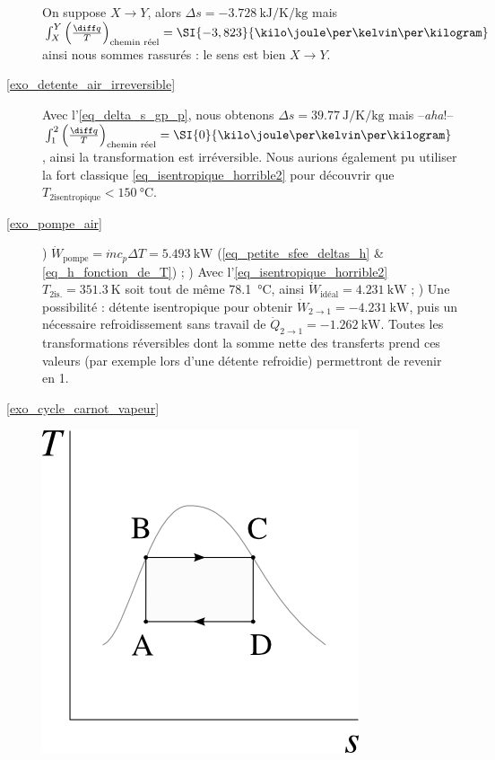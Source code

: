 \begin{description}
						\tab On suppose $X\to Y$, alors $\Delta s = \SI{-3,728}{\kilo\joule\per\kelvin\per\kilogram}$ mais $\int_X^Y \left(\frac{\diff q}{T}\right)_\text{chemin réel} = \SI{-3,823}{\kilo\joule\per\kelvin\per\kilogram}$ ainsi nous sommes rassurés : le sens est bien $X\to Y$.
		\item [\ref{exo_detente_air_irreversible}]
						\tab Avec l’\cref{eq_delta_s_gp_p}, nous obtenons $\Delta s = \SI{+39,77}{\joule\per\kelvin\per\kilogram}$ mais --\textit{aha}!-- $\int_1^2 \left(\frac{\diff q}{T}\right)_\text{chemin réel} = \SI{0}{\kilo\joule\per\kelvin\per\kilogram}$, ainsi la transformation est irréversible. Nous aurions également pu utiliser la fort classique \cref{eq_isentropique_horrible2} pour découvrir que $T_{2 \text{isentropique}} < \SI{150}{\degreeCelsius}$.
		\item [\ref{exo_pompe_air}] 	
						) $\dot{W}_\text{pompe} = \dot m c_p \Delta T = \SI{+5,493}{\kilo\watt}$ (\ref{eq_petite_sfee_deltas_h} \& \ref{eq_h_fonction_de_T}) ;
						) Avec l’\cref{eq_isentropique_horrible2} $T_{2 \text{is.}} = \SI{351,3}{\kelvin}$ soit tout de même \SI{78,1}{\degreeCelsius}, ainsi $\dot{W}_\text{idéal} = \SI{+4,231}{\kilo\watt}$ ;
						) Une possibilité : détente isentropique pour obtenir $\dot{W}_{2\to 1} = \SI{-4,231}{\kilo\watt}$, puis un nécessaire refroidissement sans travail de $\dot{Q}_{2\to 1} = \SI{-1,262}{\kilo\watt}$. Toutes les transformations réversibles dont la somme nette des transferts prend ces valeurs (par exemple lors d’une détente refroidie) permettront de revenir en 1.
		\item [\ref{exo_cycle_carnot_vapeur}]
						\includegraphics[width=\solutiondiagramwidth]{images/exo_sol_ts_carnot_vapeur1.png}

\end{description}
